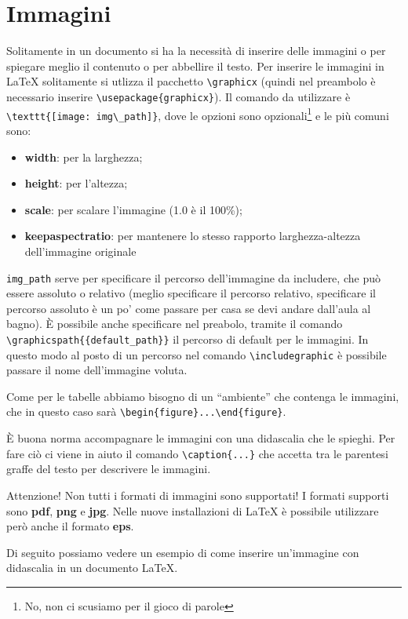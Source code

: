 \section{Immagini}
Solitamente in un documento si ha la necessità di inserire delle immagini o 
per spiegare meglio il contenuto o per abbellire il testo. Per inserire le 
immagini in \LaTeX{} solitamente si utlizza il pacchetto \verb!\graphicx! 
(quindi nel preambolo è necessario inserire \verb!\usepackage{graphicx}!). Il 
comando da utilizzare è \verb!\texttt{[image: img\_path]}!, dove le 
opzioni sono opzionali\footnote{No, non ci scusiamo per il gioco di parole} e 
le più comuni sono:
\begin{itemize}
    \item \textbf{width}: per la larghezza;
    \item \textbf{height}: per l'altezza;
    \item \textbf{scale}: per scalare l'immagine (1.0 è il 100\%);
    \item \textbf{keepaspectratio}: per mantenere lo stesso rapporto 
    larghezza-altezza dell’immagine originale
\end{itemize}
\verb!img_path! serve per specificare il percorso dell'immagine da includere, 
che può essere assoluto o relativo (meglio specificare il percorso relativo, 
specificare il percorso assoluto è un po' come passare per casa se devi andare 
dall'aula al bagno). È possibile anche specificare nel preabolo, tramite il 
comando \verb!\graphicspath{{default_path}}! il percorso di default per le 
immagini. In questo modo al posto di un percorso nel comando 
\verb!\includegraphic! è possibile passare il nome dell'immagine voluta.

Come per le tabelle abbiamo bisogno di un ``ambiente'' che contenga le 
immagini, che in questo caso sarà \verb!\begin{figure}...\end{figure}!.

È buona norma accompagnare le immagini con una didascalia che le spieghi. Per 
fare ciò ci viene in aiuto il comando \verb!\caption{...}! che accetta tra le 
parentesi graffe del testo per descrivere le immagini.

Attenzione! Non tutti i formati di immagini sono supportati! I formati 
supporti sono \textbf{pdf}, \textbf{png} e \textbf{jpg}. Nelle nuove 
installazioni di \LaTeX{} è possibile utilizzare però anche il formato \textbf{
eps}.

Di seguito possiamo vedere un esempio di come inserire un'immagine con 
didascalia in un documento \LaTeX{}.




